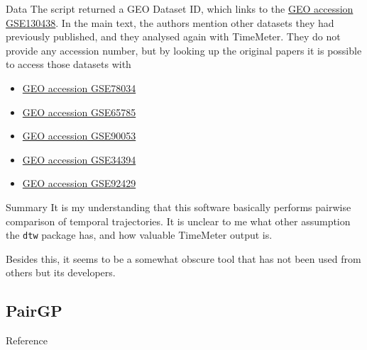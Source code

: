 \documentclass[10pt,a4paper]{article}
\newlength{\templength}
\newenvironment{ann_section}[1]
{\settowidth{\templength}{#1}%
\noindent\textbf{#1}
\hspace{1em}\begin{minipage}[t]{\dimexpr \linewidth-\the\templength-2em}}
{\end{minipage}\par\bigskip}
\begin{document}
\begin{ann_section}{Data}
The script returned a GEO Dataset ID, which links to the \href{https://www.ncbi.nlm.nih.gov/geo/query/acc.cgi?acc=GSE130438}{GEO accession GSE130438}. In the main text, the authors mention other datasets they had previously published, and they analysed again with TimeMeter. They do not provide any accession number, but by looking up the original papers it is possible to access those datasets with
\begin{itemize}
    \item \href{https://www.ncbi.nlm.nih.gov/geo/query/acc.cgi?acc=GSE78034}{GEO accession GSE78034}
    \item \href{https://www.ncbi.nlm.nih.gov/geo/query/acc.cgi?acc=GSE65785}{GEO accession GSE65785}
    \item \href{https://www.ncbi.nlm.nih.gov/geo/query/acc.cgi?acc=GSE90053}{GEO accession GSE90053}
    \item \href{https://www.ncbi.nlm.nih.gov/geo/query/acc.cgi?acc=GSE34394}{GEO accession GSE34394}
    \item \href{https://www.ncbi.nlm.nih.gov/geo/query/acc.cgi?acc=GSE92429}{GEO accession GSE92429}
\end{itemize}  
\end{ann_section}

\begin{ann_section}{Summary}
It is my understanding that this software basically performs pairwise comparison of temporal trajectories. It is unclear to me what other assumption the \texttt{dtw} package has, and how valuable TimeMeter output is.

Besides this, it seems to be a somewhat obscure tool that has not been used from others but its developers.
\end{ann_section}

\subsection{PairGP}
\begin{ann_section}{Reference}
\mbox{}
\end{ann_section}
\end{document}
